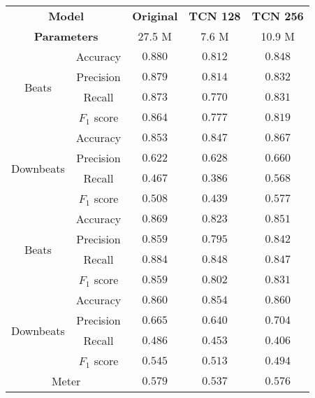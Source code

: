 \begin{tabular}{cc|ccc}
    \multicolumn{2}{c|}{\textbf{Model}} & \textbf{Original} & \textbf{TCN 128} & \textbf{TCN 256} \\
    \multicolumn{2}{c|}{\textbf{Parameters}} & 27.5 M & 7.6 M & 10.9 M \\\hline
    \multirow{4}{*}{Beats}     & Accuracy    & $\mathbf{0.880}$ & $0.812$  & $0.848$          \\
    & Precision   & $\mathbf{0.879}$ & $0.814$  & $0.832$          \\
    & Recall      & $\mathbf{0.873}$ & $0.770$  & $0.831$          \\
    & $F_1$ score & $\mathbf{0.864}$ & $0.777$  & $0.819$          \\\hline
    \multirow{4}{*}{Downbeats} & Accuracy    & $0.853$          & $0.847$  & $\mathbf{0.867}$ \\
    & Precision   & $0.622$          & $0.628$  & $\mathbf{0.660}$ \\
    & Recall      & $0.467$          & $0.386$  & $\mathbf{0.568}$ \\
    & $F_1$ score & $0.508$          & $0.439$  & $\mathbf{0.577}$ \\\hline
    \multirow{4}{*}{Beats}     & Accuracy    & $\mathbf{0.869}$ & $0.823$  & $0.851$          \\
    & Precision   & $\mathbf{0.859}$ & $0.795$  & $0.842$          \\
    & Recall      & $\mathbf{0.884}$ & $0.848$  & $0.847$          \\
    & $F_1$ score & $\mathbf{0.859}$ & $0.802$  & $0.831$          \\\hline
    \multirow{4}{*}{Downbeats} & Accuracy    & $\mathbf{0.860}$ & $0.854$  & $\mathbf{0.860}$ \\
    & Precision   & $0.665$          & $0.640$  & $\mathbf{0.704}$ \\
    & Recall      & $\mathbf{0.486}$ & $0.453$  & $0.406$          \\
    & $F_1$ score & $\mathbf{0.545}$ & $0.513$  & $0.494$          \\\hline
    \multicolumn{2}{c|}{Meter} & $\mathbf{0.579}$ & $0.537$ & $0.576$ \\
\end{tabular}
